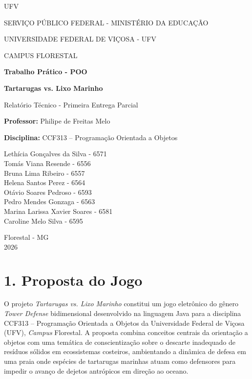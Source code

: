\documentclass[11pt,a4paper]{article}
\begin{document}
\begin{titlepage}
\centering
\vspace*{0.2cm}
{\fontsize{40}{44}\selectfont\sffamily U\textcolor[HTML]{861D23}{F}\textcolor[HTML]{C9A733}{V}\par}
\vspace{0.2cm}
{\small SERVIÇO PÚBLICO FEDERAL - MINISTÉRIO DA EDUCAÇÃO\par}
\vspace{0.15cm}
{\small UNIVERSIDADE FEDERAL DE VIÇOSA - UFV\par}
\vspace{0.15cm}
{\small CAMPUS FLORESTAL\par}
\vspace{3.5cm}
{\Large\bfseries Trabalho Prático - POO\par}
\vspace{0.4cm}
{\large\bfseries Tartarugas vs. Lixo Marinho\par}
\vspace{0.2cm}
{\normalsize Relatório Técnico - Primeira Entrega Parcial\par}
\vspace{0.4cm}
{\small\textbf{Professor:} Philipe de Freitas Melo\par}
{\small\textbf{Disciplina:} CCF313 -- Programação Orientada a Objetos\par}
\vspace{1.8cm}
\begin{flushright}
Lethícia Gonçalves da Silva - 6571\\[3pt]
Tomás Viana Resende - 6556\\[3pt]
Bruna Lima Ribeiro - 6557\\[3pt]
Helena Santos Perez - 6564\\[3pt]
Otávio Soares Pedroso - 6593\\[3pt]
Pedro Mendes Gonzaga - 6563\\[3pt]
Marina Larissa Xavier Soares - 6581\\[3pt]
Caroline Melo Silva - 6595\\[3pt]
\end{flushright}
\vfill
Florestal - MG\\[5pt]
2026
\end{titlepage}

\clearpage
\section*{1. Proposta do Jogo}
O projeto \textit{Tartarugas vs. Lixo Marinho} constitui um jogo eletrônico do gênero \textit{Tower Defense} bidimensional desenvolvido na linguagem Java para a disciplina CCF313 -- Programação Orientada a Objetos da Universidade Federal de Viçosa (UFV), \textit{Campus} Florestal. A proposta combina conceitos centrais da orientação a objetos com uma temática de conscientização sobre o descarte inadequado de resíduos sólidos em ecossistemas costeiros, ambientando a dinâmica de defesa em uma praia onde espécies de tartarugas marinhas atuam como defensores para impedir o avanço de dejetos antrópicos em direção ao oceano.
\end{document}
